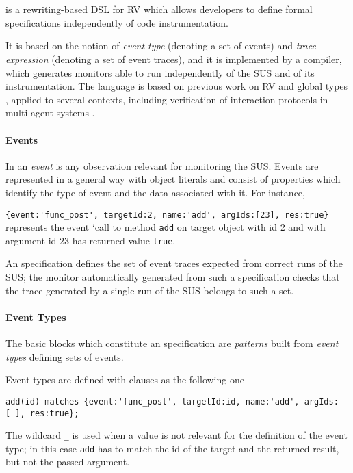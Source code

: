 \section{\rml}
\label{sec:rml}
\rml\cite{RML2021} is a rewriting-based DSL for RV which allows developers to define formal specifications independently of code instrumentation.

It  is based on the notion of \emph{event type} (denoting a set of events) and \emph{trace expression} (denoting a set of event traces),
and it is implemented by a compiler, which generates monitors able to run independently of the SUS and of its instrumentation. 
The language is based on previous work on RV and global types \cite{CastagnaEtAl12,AnconaBB0CDGGGH16,AnconaFM17},
applied to several contexts, including verification of interaction protocols in multi-agent systems \cite{AnconaDM12,AnconaBFMT14, BriolaMA14}.

\paragraph{Events}
In \rml an \emph{event} is any observation relevant for monitoring the SUS.
Events are represented in a general way with object literals and
consist of properties which identify the type of event and the data associated with it. For instance,

\lstinline!{event:'func_post', targetId:2, name:'add', argIds:[23], res:true}!
represents the event
`call to method \lstinline{add} on target object with id 2 and with argument id 23  has returned value \lstinline{true}.

An \rml specification defines the set of event traces expected from correct runs of the SUS; the monitor automatically generated from
such a specification checks that the trace generated by a single run of the SUS belongs to such a set.

\paragraph{Event Types}
The basic blocks which constitute an \rml specification are \emph{patterns} built from
\emph{event types} defining sets of events.

Event types are defined with clauses as the following one
\begin{lstlisting}[basicstyle=\ttfamily\footnotesize]
add(id) matches {event:'func_post', targetId:id, name:'add', argIds:[_], res:true};
\end{lstlisting}
The wildcard \lstinline!_! is used when a value is not relevant for
the definition of the event type; in this case \lstinline{add} has to match the
id of the target and the returned result, but not the passed argument.

